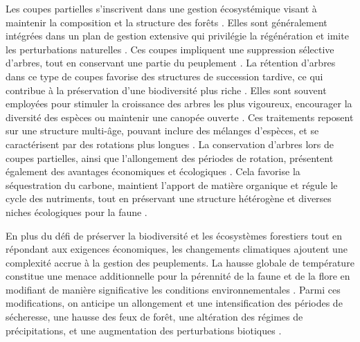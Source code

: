 Les coupes partielles s'inscrivent dans une gestion écosystémique visant à maintenir la composition et la structure des forêts \citep{Bergeron1999Forestmanagementa}.
Elles sont généralement intégrées dans un plan de gestion extensive qui privilégie la régénération et imite les perturbations naturelles \citep{Irland2011Timberproductivity}. 
Ces coupes impliquent une suppression sélective d'arbres, tout en conservant une partie du peuplement \citep{Ameray2021Forestcarbon}. 
La rétention d'arbres dans ce type de coupes favorise des structures de succession tardive, ce qui contribue à la préservation d'une biodiversité plus riche \citep{Ameray2021Forestcarbon}.
Elles sont souvent employées pour stimuler la croissance des arbres les plus vigoureux, encourager la diversité des espèces ou maintenir une canopée ouverte \citep{Irland2011Timberproductivity}.
Ces traitements reposent sur une structure multi-âge, pouvant inclure des mélanges d'espèces, et se caractérisent par des rotations plus longues \citep{Kuuluvainen2009Forestmanagement}. 
La conservation d'arbres lors de coupes partielles, ainsi que l'allongement des périodes de rotation, présentent également des avantages économiques et écologiques \citep{Ameray2021Forestcarbon}. 
Cela favorise la séquestration du carbone, maintient l'apport de matière organique et régule le cycle des nutriments, tout en préservant une structure hétérogène et diverses niches écologiques pour la faune \citep{Dahlgren1994effectswholetree,Barg1999Influencepartial,Tong2020Forestmanagement,Ameray2021Forestcarbon}. 

En plus du défi de préserver la biodiversité et les écosystèmes forestiers tout en répondant aux exigences économiques, les changements climatiques ajoutent une complexité accrue à la gestion des peuplements.
La hausse globale de température constitue une menace additionnelle pour la pérennité de la faune et de la flore en modifiant de manière significative les conditions environnementales \citep{McKenney2009Climatechange,Trumbore2015Foresthealth,Seidl2017Forestdisturbances,Messier2022Warningnatural}. 
Parmi ces modifications, on anticipe un allongement et une intensification des périodes de sécheresse, une hausse des feux de forêt, une altération des régimes de précipitations, et une augmentation des perturbations biotiques \citep{Parmesan2007Influencesspecies,Joyce2013Climatechange,Gatti2021Amazoniacarbon,Heidari2021Effectsclimate}. 

